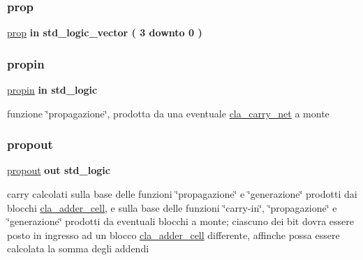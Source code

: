 \subsubsection{\texorpdfstring{prop}{prop}}
{\footnotesize\ttfamily \hyperlink{group___carry_network_gac1f84cd3374a5a4d2ee2669ebdadafe8}{prop} {\bfseries \textcolor{vhdlchar}{in}\textcolor{vhdlchar}{ }} {\bfseries \textcolor{vhdlchar}{std\+\_\+logic\+\_\+vector}\textcolor{vhdlchar}{ }\textcolor{vhdlchar}{(}\textcolor{vhdlchar}{ }\textcolor{vhdlchar}{ } \textcolor{vhdldigit}{3} \textcolor{vhdlchar}{ }\textcolor{vhdlchar}{downto}\textcolor{vhdlchar}{ }\textcolor{vhdlchar}{ } \textcolor{vhdldigit}{0} \textcolor{vhdlchar}{ }\textcolor{vhdlchar}{)}\textcolor{vhdlchar}{ }} \hspace{0.3cm}{\ttfamily [Port]}}

\mbox{\label{group___carry_network_ga422e8e7ee01fc7ac7b7390cd2ad8c87b}} 
\subsubsection{\texorpdfstring{propin}{propin}}
{\footnotesize\ttfamily \hyperlink{group___carry_network_ga422e8e7ee01fc7ac7b7390cd2ad8c87b}{propin} {\bfseries \textcolor{vhdlchar}{in}\textcolor{vhdlchar}{ }} {\bfseries \textcolor{vhdlchar}{std\+\_\+logic}\textcolor{vhdlchar}{ }} \hspace{0.3cm}{\ttfamily [Port]}}



funzione \char`\"{}propagazione\char`\"{}, prodotta da una eventuale \hyperlink{classcla__carry__net}{cla\+\_\+carry\+\_\+net} a monte 

\mbox{\label{group___carry_network_ga5957c9cdd706cafd2da8855133a002c9}} 
\subsubsection{\texorpdfstring{propout}{propout}}
{\footnotesize\ttfamily \hyperlink{group___carry_network_ga5957c9cdd706cafd2da8855133a002c9}{propout} {\bfseries \textcolor{vhdlchar}{out}\textcolor{vhdlchar}{ }} {\bfseries \textcolor{vhdlchar}{std\+\_\+logic}\textcolor{vhdlchar}{ }} \hspace{0.3cm}{\ttfamily [Port]}}

carry calcolati sulla base delle funzioni \char`\"{}propagazione\char`\"{} e \char`\"{}generazione\char`\"{} prodotti dai blocchi \hyperlink{classcla__adder__cell}{cla\+\_\+adder\+\_\+cell}, e sulla base delle funzioni \char`\"{}carry-\/in\char`\"{}, \char`\"{}propagazione\char`\"{} e \char`\"{}generazione\char`\"{} prodotti da eventuali blocchi a monte; ciascuno dei bit dovra\textquotesingle{} essere posto in ingresso ad un blocco \hyperlink{classcla__adder__cell}{cla\+\_\+adder\+\_\+cell} differente, affinche\textquotesingle{} possa essere calcolata la somma degli addendi 